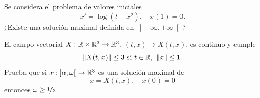 \documentclass[12pt]{article}
\begin{document}
    \begin{ejercicio}
        Se considera el problema de valores iniciales
        \[
            x' = \log(t - x^2), \quad x(1) = 0.
        \]
        ¿Existe una solución maximal definida en $\left]-\infty, +\infty\right[$?
    \end{ejercicio}

    \begin{ejercicio}
        El campo vectorial $X : \mathbb{R} \times \mathbb{R}^3 \to \mathbb{R}^3$, $(t, x) \mapsto X(t, x)$, es continuo y cumple
        \[
            \|X(t, x)\| \leq 3 \text{ si } t \in \mathbb{R}, \ \|x\| \leq 1.
        \]
        Prueba que si $x : \left]\alpha, \omega\right[ \to \mathbb{R}^3$ es una solución maximal de
        \[
            \dot{x} = X(t, x), \quad x(0) = 0
        \]
        entonces $\omega \geq \nicefrac{1}{3}$.
    \end{ejercicio}

    \newpage
    \setcounter{ejercicio}{0} %
    \noindent
\end{document}
